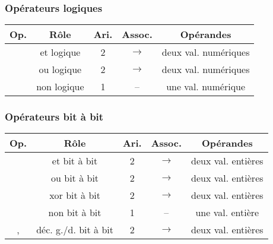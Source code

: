 \begin{frame}[fragile]
\frametitle{Opérateurs logiques}

\begin{center}
    \begin{tabular}{c|c|c|c|c}
        {\bf Op.} & {\bf Rôle} & {\bf Ari.} & {\bf Assoc.}
            & {\bf Opérandes} \\ \hline \hline
        \Code{\&\&} & et logique & 2 & $\longrightarrow$
            & deux val. numériques \\ \hline
        \Code{||} & ou logique & 2 & $\longrightarrow$
            & deux val. numériques \\ \hline
        \Code{!} & non logique & 1 & --
            & une val. numérique
    \end{tabular}
\end{center}
\medskip

\end{frame}

\begin{frame}[fragile]
\frametitle{Opérateurs bit à bit}

\begin{center}
    \begin{tabular}{c|c|c|c|c}
        {\bf Op.} & {\bf Rôle} & {\bf Ari.} & {\bf Assoc.}
            & {\bf Opérandes} \\ \hline \hline
        \Code{\&} & et bit à bit & 2 & $\longrightarrow$
            & deux val. entières \\ \hline
        \Code{|} & ou bit à bit & 2 & $\longrightarrow$
            & deux val. entières \\ \hline
        \Code{\textasciicircum} & xor bit à bit & 2 & $\longrightarrow$
            & deux val. entières \\ \hline
        \Code{$\sim$} & non bit à bit & 1 & --
            & une val. entière \\ \hline
        \Code{<\,<}, \Code{>\,>} & déc. g./d. bit à bit & 2
            & $\longrightarrow$ & deux val. entières
    \end{tabular}
\end{center}
\end{frame}

